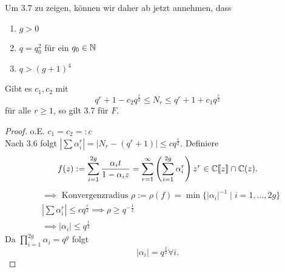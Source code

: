 \begin{bemerkungnr}
    Um 3.7 zu zeigen, können wir daher ab jetzt annehmen, dass
    \begin{enumerate}[label=(\roman*)]
        \item $g > 0$
        \item $q = q_0^2$ für ein $q_0 \in \mathbb{N}$
        \item $q > (g+1)^4$
    \end{enumerate}
\end{bemerkungnr}

\begin{satz}
    Gibt es $c_1, c_2$ mit
    $$ q^r + 1 - c_2 q^\frac{r}{2} \leq N_r \leq q^r + 1 + c_1 q^\frac{r}{2}$$
    für alle $r \geq 1$, so gilt 3.7 für $F$.
\end{satz}
\begin{proof}
    o.E. $c_1 = c_2 =: c$\\
    Nach 3.6 folgt $\left|\sum \alpha_i^r \right| = \left| N_r - (q^r + 1)\right| \leq c q^\frac{r}{2}$. Definiere
    $$ f(z) := \sum_{i=1}^{2g} \frac{\alpha_it}{1-\alpha_iz} = \sum_{r=1}^\infty\left(\sum_{i=1}^{2g} \alpha_i^r\right)z^r \in \mathbb{C}\llbracket z\rrbracket \cap \mathbb{C}(z).$$
    \begin{align*}
        &\implies \text{ Konvergenzradius } \rho := \rho(f) = \min\{|\alpha_i|^{-1} \mid i = 1,\ldots,2g\}\\
        & \left|\sum \alpha_i^r\right| \leq c q^\frac{r}{2} \implies \rho \geq q^{-\frac{1}{2}}\\
        & \implies |\alpha_i| \leq q^\frac{1}{2}
    \end{align*}
    Da $\prod\limits_{i=1}^{2g}\alpha_i = q^g$ folgt 
    $$ |\alpha_i| = q^\frac{1}{2} \forall i. $$
\end{proof}

